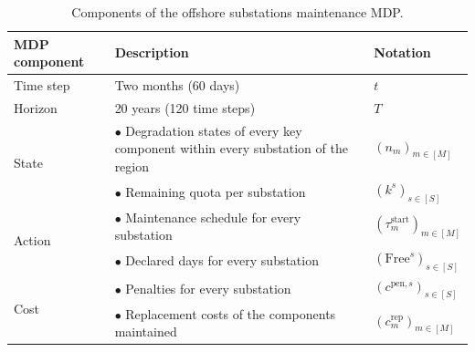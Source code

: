 \documentclass{article}
\begin{document}
\begin{table}[h]
\centering
\begin{tabular}{lp{6.2cm}p{2.8cm}}
\toprule
MDP component & Description & Notation \\
\midrule
Time step & Two months (60 days) & $t$ \\
\midrule
Horizon & 20 years (120 time steps) & $T$ \\
\midrule
\multirow{2}{*}{State}
 & $\bullet$ Degradation states of every key component within every substation of the region & $(n_m)_{m \in [M]}$ \\
 & $\bullet$ Remaining quota per substation & $(k^s)_{s \in [S]}$ \\
\midrule
\multirow{2}{*}{Action}
 & $\bullet$ Maintenance schedule for every substation & $(\tau^{\text{start}}_m)_{m \in [M]}$ \\
 & $\bullet$ Declared days for every substation & $(\text{Free}^s)_{s \in [S]}$ \\
\midrule
\multirow{2}{*}{Cost}
 & $\bullet$ Penalties for every substation & $(c^{\mathrm{pen},s})_{s \in [S]}$ \\
 & $\bullet$ Replacement costs of the components maintained & $(c^{\mathrm{rep}}_m)_{m \in [M]}$ \\
\bottomrule
\end{tabular}
\caption{Components of the offshore substations maintenance MDP.}
\label{tab:mdp-components}
\end{table}

\label{sec:model-details}
\label{sec:decomposable-MDPs}
\end{document}
